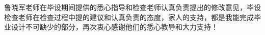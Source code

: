 
\thesisacknowledgement

鲁晓军老师在毕设期间提供的悉心指导和检查老师认真负责提出的修改意见，毕设检查老师在检查过程中提的建议和认真负责的态度，家人的支持，都是我能完成毕业设计不可缺少的部分，再次衷心感谢他们的悉心教导和大力支持！
